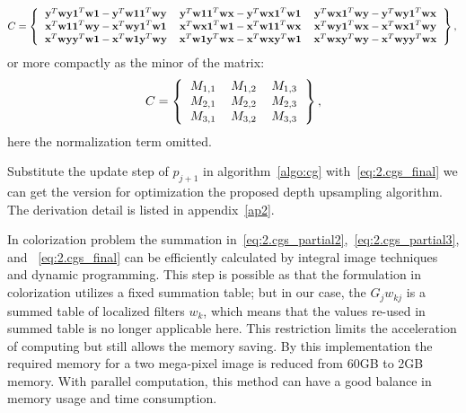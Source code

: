 \begin{landscape}
\begin{equation}
C = \left \{
  \begin{tabular}{ccc}
  $\textbf{y}^T\textbf{wy1}^T\textbf{w1}-\textbf{y}^T\textbf{w11}^T\textbf{wy}$ & $\textbf{y}^T\textbf{w11}^T\textbf{wx}-\textbf{y}^T\textbf{wx1}^T\textbf{w1}$ & $\textbf{y}^T\textbf{wx1}^T\textbf{wy}-\textbf{y}^T\textbf{wy1}^T\textbf{wx}$ \\
  $\textbf{x}^T\textbf{w11}^T\textbf{wy}-\textbf{x}^T\textbf{wy1}^T\textbf{w1}$ & $\textbf{x}^T\textbf{wx1}^T\textbf{w1}-\textbf{x}^T\textbf{w11}^T\textbf{wx}$ & $\textbf{x}^T\textbf{wy1}^T\textbf{wx}-\textbf{x}^T\textbf{wx1}^T\textbf{wy}$ \\
  $\textbf{x}^T\textbf{wyy}^T\textbf{w1}-\textbf{x}^T\textbf{w1y}^T\textbf{wy}$ & $\textbf{x}^T\textbf{w1y}^T\textbf{wx}-\textbf{x}^T\textbf{wxy}^T\textbf{w1}$ & $\textbf{x}^T\textbf{wxy}^T\textbf{wy}-\textbf{x}^T\textbf{wyy}^T\textbf{wx}$
  \end{tabular}
\right \},\\
\label{eq:2.inverse}
\end{equation}
or more compactly as the minor of the matrix:\\
\begin{equation}
C = \left \{
  \begin{tabular}{ccc}
  $M_{1,1}$ & $M_{1,2}$ & $M_{1,3}$ \\
  $M_{2,1}$ & $M_{2,2}$ & $M_{2,3}$ \\
  $M_{3,1}$ & $M_{3,2}$ & $M_{3,3}$
  \end{tabular}
\right \},
\end{equation}
here the normalization term omitted.
\end{landscape}
Substitute the update step of $p_{j+1}$ in algorithm~\ref{algo:cg} with~\eqref{eq:2.cgs_final} we can get the version for optimization the proposed depth upsampling algorithm. The derivation detail is listed in appendix~\ref{ap2}.

In colorization problem the summation in~\eqref{eq:2.cgs_partial2},~\eqref{eq:2.cgs_partial3}, and ~\eqref{eq:2.cgs_final} can be efficiently calculated by integral image techniques and dynamic programming. This step is possible as that the formulation in colorization utilizes a fixed summation table; but in our case, the $G_{j}w_{kj}$ is a summed table of localized filters $w_{k}$, which means that the values re-used in summed table is no longer applicable here. This restriction limits the acceleration of computing but still allows the memory saving. By this implementation the required memory for a two mega-pixel image is reduced from 60GB to 2GB memory. With parallel computation, this method can have a good balance in memory usage and time consumption.



